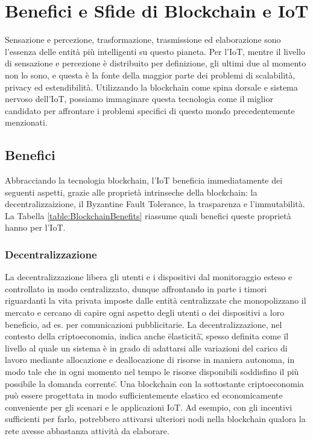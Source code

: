 \section{Benefici e Sfide di Blockchain e IoT}
Sensazione e percezione, trasformazione, trasmissione ed elaborazione sono l'essenza delle entità più intelligenti su questo pianeta. Per l'IoT, mentre il livello di sensazione e percezione è distribuito per definizione, gli ultimi due al momento non lo sono, e questa è la fonte della maggior parte dei problemi di scalabilità, privacy ed estendibilità. Utilizzando la blockchain come spina dorsale e sistema nervoso dell'IoT, possiamo immaginare questa tecnologia come il miglior candidato per affrontare i problemi specifici di questo mondo precedentemente menzionati.

\subsection{Benefici}
Abbracciando la tecnologia blockchain, l'IoT beneficia immediatamente dei seguenti aspetti, grazie alle proprietà intrinseche della blockchain: la decentralizzaizione, il Byzantine Fault Tolerance, la trasparenza e l'immutabilità. La Tabella \ref{table:BlockchainBenefits} riassume quali benefici queste proprietà hanno per l'IoT.


\subsubsection{Decentralizzazione}
La decentralizzazione libera gli utenti e i dispositivi dal monitoraggio esteso e controllato in modo centralizzato, dunque affrontando in parte i timori riguardanti la vita privata imposte dalle entità centralizzate che monopolizzano il mercato e cercano di capire ogni aspetto degli utenti o dei dispositivi a loro beneficio, ad es. per comunicazioni pubblicitarie. La decentralizzazione, nel contesto della criptoeconomia, indica anche \"elasticità\", spesso definita come \"il livello al quale un sistema è in grado di adattarsi alle variazioni del carico di lavoro mediante allocazione e deallocazione di risorse in maniera autonoma, in modo tale che in ogni momento nel tempo le risorse disponibili soddisfino il più possibile la domanda corrente\". Una blockchain con la sottostante criptoeconomia può essere progettata in modo sufficientemente elastico ed economicamente conveniente per gli scenari e le applicazioni IoT. Ad esempio, con gli  incentivi sufficienti per farlo, potrebbero attivarsi ulteriori nodi nella blockchain qualora la rete avesse abbastanza attività da elaborare.

